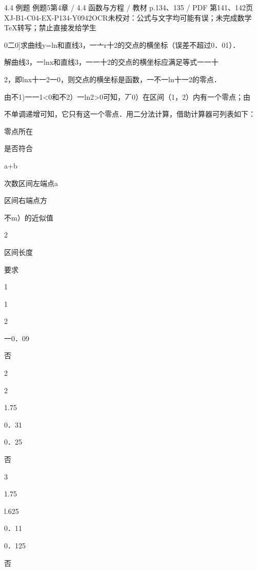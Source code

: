 \begin{bankitem}{4.4 例题 例题5}{第4章 / 4.4 函数与方程 / 教材 p.134、135 / PDF 第141、142页}{XJ-B1-C04-EX-P134-Y0942}{OCR未校对：公式与文字均可能有误；未完成数学TeX转写；禁止直接发给学生}
\begin{ocrdraft}
\par
0二0]求曲线y=ln和直线3，一亠r十2的交点的横坐标（误差不超过0．01）．
\par
解曲线3，一lnx和直线3，一一十2的交点的横坐标应满足等式一一十
\par
2，即lnx十一2一0，则交点的横坐标是函数，一不一ln十一2的零点．
\par
由不1)一一1<0和不2）一ln2>0可知，丆0）在区间（1，2）内有一个零点；由
\par
不单调递增可知，它只有这一个零点．用二分法计算，借助计算器可列表如下：
\par
零点所在
\par
是否符合
\par
a+b
\par
次数区间左端点a
\par
区间右端点方
\par
不m）的近似值
\par
2
\par
区间长度
\par
要求
\par
1
\par
1
\par
2
\par
一0．09
\par
否
\par
2
\par
2
\par
1.75
\par
0．31
\par
0．25
\par
否
\par
3
\par
1.75
\par
l.625
\par
0．11
\par
0．125
\par
否
\par

\end{ocrdraft}
\end{bankitem}
